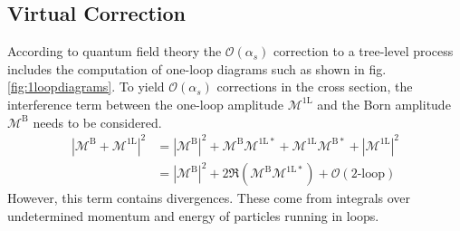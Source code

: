 \subsection{Virtual Correction}
According to quantum field theory the $\mathcal{O}(\alpha_s)$ correction to a tree-level process includes the computation of one-loop diagrams such as shown in fig. \ref{fig:1loopdiagrams}. To yield $\mathcal{O}(\alpha_s)$ corrections in the cross section, the interference term between the one-loop amplitude $\mathcal{M}^{\mathrm{1L}}$ and the Born amplitude $\mathcal{M}^{\mathrm{B}}$ needs to be considered. 
\begin{align}
\left| \mathcal{M}^{\mathrm{B}} + \mathcal{M}^{\mathrm{1L}} \right|^2 &= \left| \mathcal{M}^{\mathrm{B}} \right|^2 + \mathcal{M}^{\mathrm{B}} \mathcal{M}^{\mathrm{1L}\ast} + \mathcal{M}^{\mathrm{1L}} \mathcal{M}^{\mathrm{B}\ast} + \left| \mathcal{M}^{\mathrm{1L}} \right|^2\nonumber\\
&= \left| \mathcal{M}^{\mathrm{B}} \right|^2 + 2 \Re \left( \mathcal{M}^{\mathrm{B}} \mathcal{M}^{\mathrm{1L}\ast} \right) + \mathcal{O}(\mbox{2-loop})
\end{align}
However, this term contains divergences. These come from integrals over undetermined momentum and energy of particles running in loops.
